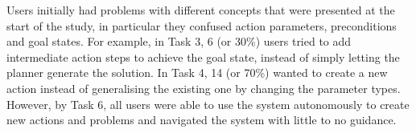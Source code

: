 %
Users initially had problems with different concepts that were presented at the start of the study, in particular they confused action parameters, preconditions and goal states.
For example, in Task 3, 6 (or 30\%) users tried to add intermediate action steps to achieve the goal state, instead of simply letting the planner generate the solution.
In Task 4, 14 (or 70\%) wanted to create a new action instead of generalising the existing one by changing the parameter types.
However, by Task 6, all users were able to use the system autonomously to create new actions and problems and navigated the system with little to no guidance.
%
%
%
%
